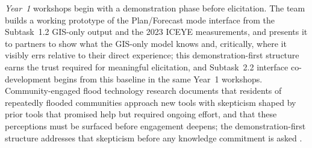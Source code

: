 \documentclass[11pt]{article}
\begin{document}
\textit{Year~1} workshops begin with a demonstration phase before elicitation. The team builds a working prototype of the Plan/Forecast mode interface from the Subtask~1.2 GIS-only output and the 2023 ICEYE measurements, and presents it to partners to show what the GIS-only model knows and, critically, where it visibly errs relative to their direct experience; this demonstration-first structure earns the trust required for meaningful elicitation, and Subtask~2.2 interface co-development begins from this baseline in the same Year~1 workshops.
Community-engaged flood technology research documents that residents of repeatedly flooded communities approach new tools with skepticism shaped by prior tools that promised help but required ongoing effort, and that these perceptions must be surfaced before engagement deepens; the demonstration-first structure addresses that skepticism before any knowledge commitment is asked \cite{skilton2022dontwant,habib2023anchoring}.
\end{document}
